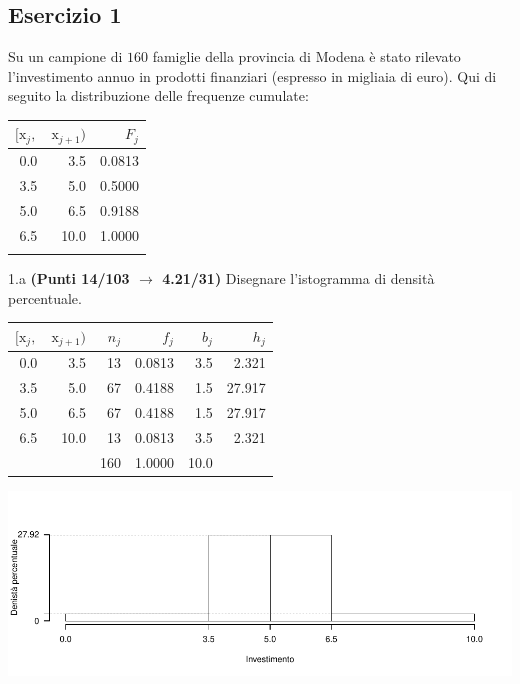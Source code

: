 \documentclass[
  11pt,
]{book}
\theoremstyle{mytheoremstyle}
\theoremstyle{mydefstyle}
\newenvironment{sol}
  {
  \begin{tcolorbox}[enhanced,breakable,arc=0.1mm,boxrule=1pt,colback=white,colframe=iblue,
  title=\bf \fontfamily{lmss}\selectfont \hspace{.5 cm} Soluzione,drop fuzzy shadow]

}{
\end{tcolorbox}
  }
\begin{document}
\subsection{Esercizio 1}\label{esercizio-1-22}

Su un campione di \(160\) famiglie della provincia di Modena è stato rilevato l'investimento annuo in prodotti finanziari (espresso in migliaia di euro). Qui di seguito la distribuzione delle frequenze cumulate:

\begin{table}[H]
\centering
\begin{tabular}{rrr}
\toprule
$[\text{x}_j,$ & $\text{x}_{j+1})$ & $F_j$\\
\midrule
0.0 & 3.5 & 0.0813\\
3.5 & 5.0 & 0.5000\\
5.0 & 6.5 & 0.9188\\
6.5 & 10.0 & 1.0000\\
 &  & \\
\bottomrule
\end{tabular}
\end{table}

1.a \textbf{(Punti 14/103 \(\rightarrow\) 4.21/31)} Disegnare l'istogramma di densità percentuale.

\begin{sol}

\begin{table}[H]
\centering
\begin{tabular}{rrrrrr}
\toprule
$[\text{x}_j,$ & $\text{x}_{j+1})$ & $n_j$ & $f_j$ & $b_j$ & $h_j$\\
\midrule
0.0 & 3.5 & 13 & 0.0813 & 3.5 & 2.321\\
3.5 & 5.0 & 67 & 0.4188 & 1.5 & 27.917\\
5.0 & 6.5 & 67 & 0.4188 & 1.5 & 27.917\\
6.5 & 10.0 & 13 & 0.0813 & 3.5 & 2.321\\
 &  & 160 & 1.0000 & 10.0 & \\
\bottomrule
\end{tabular}
\end{table}

\begin{center}\includegraphics{Esami_passati_con_soluzioni_files/figure-latex/2023-127-1} \end{center}

\end{sol}
\end{document}
